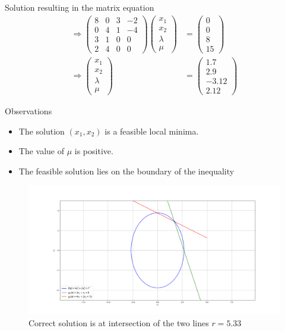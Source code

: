 \documentclass{beamer}
\begin{document}
\begin{frame}{Solution}
resulting in the matrix equation
%
\begin{align}
\Rightarrow 
\begin{pmatrix}
8 &0 & 3 & -2\\
0 &4 & 1 & -4 \\
3 & 1 & 0 &0  \\
2 & 4 & 0 & 0
\end{pmatrix}
\begin{pmatrix}
x_1 \\
x_2 \\
\lambda
\\
\mu
\end{pmatrix}
&=
\begin{pmatrix}
0 \\
0 \\
8 \\
15
\end{pmatrix}
\\
\Rightarrow 
\begin{pmatrix}
x_1 \\
x_2 \\
\lambda
\\
\mu
\end{pmatrix}
&= 
\begin{pmatrix}
1.7 \\
 2.9 \\
-3.12 \\
2.12
\end{pmatrix}
\end{align}
\end{frame}

\begin{frame}{Observations}
\begin{itemize}
\item The solution $(x_1,x_2)$ is a feasible local minima.
\item The value of $\mu$ is positive.
\item The feasible solution lies on the boundary of the inequality
\end{itemize}
\begin{figure}[!ht]
\centering
\includegraphics[width=\columnwidth]{./1.png}
\caption{ Correct solution is at intersection of the two lines $r = 5.33$}
\end{figure}
\end{frame}
\end{document}
